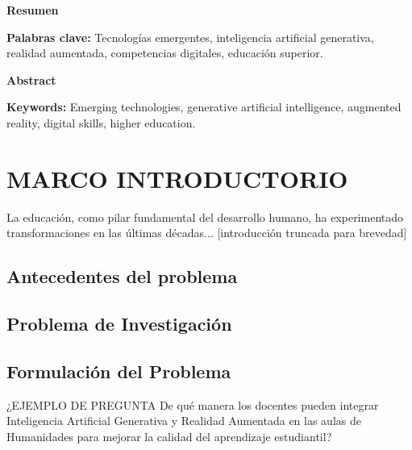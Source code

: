 \documentclass[11pt,oneside,letterpaper]{book}
\begin{document}
	\newpage
	\vspace*{\fill}
            \begin{center}
	            \textbf{Resumen}
            \end{center}
	    	\lipsum[1]

			\vspace{1em}
			\textbf{Palabras clave:} Tecnologías emergentes, inteligencia artificial generativa, realidad aumentada, competencias digitales, educación superior.

        \vspace*{\fill}

	\newpage
        \vspace*{\fill}
            \begin{center}
	            \textbf{Abstract}
            \end{center}
    		\lipsum[1]

			\vspace{1em}
			\textbf{Keywords:} Emerging technologies, generative artificial intelligence, augmented reality, digital skills, higher education.

        \vspace*{\fill}

    \newpage
	\chapter{MARCO INTRODUCTORIO}
	La educación, como pilar fundamental del desarrollo humano, ha experimentado transformaciones en las últimas décadas... [introducción truncada para brevedad]
        \section{Antecedentes del problema}
        \lipsum[1]

        \section{Problema de Investigación}
        \lipsum[1]

        \section{Formulación del Problema}
        ¿EJEMPLO DE PREGUNTA De qué manera los docentes pueden integrar Inteligencia Artificial Generativa y Realidad Aumentada en las aulas de Humanidades para mejorar la calidad del aprendizaje estudiantil?
\end{document}
